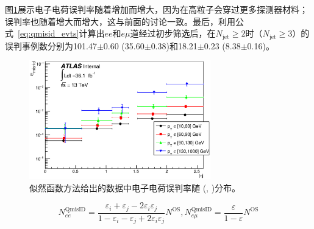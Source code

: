 图\ref{fig:qmisid_rates}展示电子电荷误判率随着\abseta 增加而增大，因为在高\abseta 粒子会穿过更多探测器材料；误判率也随着\pt 增大而增大，这与前面的讨论一致。最后，利用公式~\ref{eq:qmisid_evts}计算出$ee$和$e\mu$道经过初步筛选后，在$N_{\text{jet}}\ge2$时（$N_{\text{jet}}\ge3$）的误判事例数分别为101.47$\pm$0.60 (35.60$\pm$0.38)和18.21$\pm$0.23 (8.38$\pm$0.16)。
\begin{figure}[h]
 \centering
 \includegraphics[width=0.70\textwidth]{fig/QmisID/Rates_tight.eps}
 \caption{似然函数方法给出的数据中电子电荷误判率随 (\abseta, \pt)分布。}
\label{fig:qmisid_rates}
\end{figure}

\begin{equation}
N_{ee}^{\text{QmisID}}=\frac{\varepsilon_i+\varepsilon_j-2\varepsilon_i \varepsilon_j}{1-\varepsilon_i-\varepsilon_j +2\varepsilon_i \varepsilon_j}N^{\text{OS}},
N_{e\mu}^{\text{QmisID}}=\frac{\varepsilon}{1-\varepsilon}N^{\text{OS}}
\label{eq:qmisid_evts}
\end{equation}

